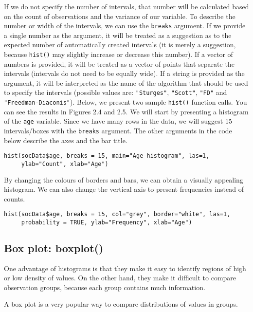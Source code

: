 \documentclass[]{book}
\theoremstyle{definition}
\theoremstyle{definition}
\theoremstyle{definition}
\theoremstyle{remark}
\begin{document}
If we do not specify the number of intervals, that number will be
calculated based on the count of observations and the variance of our
variable. To describe the number or width of the intervals, we can use
the \texttt{breaks} argument. If we provide a single number as the
argument, it will be treated as a suggestion as to the expected number
of automatically created intervals (it is merely a suggestion, because
\texttt{hist()} may slightly increase or decrease this number). If a
vector of numbers is provided, it will be treated as a vector of points
that separate the intervals (intervals do not need to be equally wide).
If a string is provided as the argument, it will be interpreted as the
name of the algorithm that should be used to specify the intervals
(possible values are: \texttt{"Sturges"}, \texttt{"Scott"},
\texttt{"FD"} and \texttt{"Freedman-Diaconis"}). Below, we present two
sample \texttt{hist()} function calls. You can see the results in
Figures 2.4 and 2.5. We will start by presenting a histogram of the
\texttt{age} variable. Since we have many rows in the data, we will
suggest 15 intervals/boxes with the \texttt{breaks} argument. The other
arguments in the code below describe the axes and the bar title.

\begin{verbatim}
hist(socData$age, breaks = 15, main="Age histogram", las=1,
     ylab="Count", xlab="Age")
\end{verbatim}

By changing the colours of borders and bars, we can obtain a visually
appealing histogram. We can also change the vertical axis to present
frequencies instead of counts.

\begin{verbatim}
hist(socData$age, breaks = 15, col="grey", border="white", las=1,
     probability = TRUE, ylab="Frequency", xlab="Age")
\end{verbatim}

\subsection{Box plot: boxplot()}\label{part_243}

One advantage of histograms is that they make it easy to identify
regions of high or low density of values. On the other hand, they make
it difficult to compare observation groups, because each group contains
much information.

A box plot is a very popular way to compare distributions of values in
groups.
\end{document}
